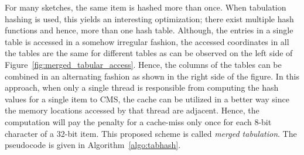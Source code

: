 \documentclass[runningheads]{llncs}
\begin{document}
For many sketches, the same item is hashed more than once. When tabulation hashing is used, this yields an interesting optimization; there exist multiple hash functions and hence, more than one hash table. Although, the entries in a single table is accessed in a somehow irregular fashion, the accessed coordinates in all the tables are the same for different tables as can be observed on the left side of Figure~\ref{fig:merged_tabular_access}. Hence, the columns of the tables can be combined in an alternating fashion as shown in the right side of the figure. In this approach, when only a single thread is responsible from computing the hash values for a single item to CMS, the cache can be utilized in a better way since the memory locations accessed by that thread are adjacent. Hence, the computation will pay the penalty for a cache-miss only once for each 8-bit character of a 32-bit item. This proposed scheme is called {\em merged tabulation}. The pseudocode is given in Algorithm~\ref{algo:tabhash}.
\end{document}
